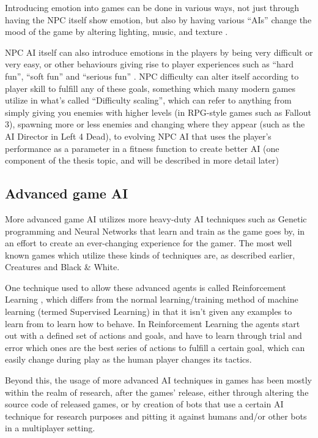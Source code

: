 \documentclass[]{report}
\begin{document}
Introducing emotion into games can be done in various ways, not just through
having the NPC itself show emotion, but also by having various ``AIs'' change
the mood of the game by altering lighting, music, and texture
\citep[chap.~9]{kirby2011introduction}.

NPC AI itself can also introduce emotions in the players by being very difficult
or very easy, or other behaviours giving rise to player experiences such as
``hard fun'', ``soft fun'' and ``serious fun'' \citep{lazzaro2004we}. NPC
difficulty can alter itself according to player skill to fulfill any of these
goals, something which many modern games utilize in what's called ``Difficulty
scaling'', which can refer to anything from simply giving you enemies with
higher levels (in RPG-style games such as Fallout 3), spawning more or less
enemies and changing where they appear (such as the AI Director in Left 4 Dead),
to evolving NPC AI that uses the player's performance as a parameter in a
fitness function to create better AI (one component of the thesis topic, and
will be described in more detail later)

\subsection{Advanced game AI}
\label{sec:advanced-game-ai}

More advanced game AI utilizes more heavy-duty AI techniques such as Genetic
programming and Neural Networks that learn and train as the game goes by, in an
effort to create an ever-changing experience for the gamer. The most well known
games which utilize these kinds of techniques are, as described earlier,
Creatures \citep{grand1997creatures} and Black \& White.

One technique used to allow these advanced agents is called Reinforcement
Learning \citep{merrick2006motivated,sutton1998reinforcement}, which differs
from the normal learning/training method of machine learning (termed Supervised
Learning) in that it isn't given any examples to learn from to learn how to
behave. In Reinforcement Learning the agents start out with a defined set of
actions and goals, and have to learn through trial and error which ones are the
best series of actions to fulfill a certain goal, which can easily change during
play as the human player changes its tactics.

Beyond this, the usage of more advanced AI techniques in games has been mostly
within the realm of research, after the games' release, either through altering
the source code of released games, or by creation of bots that use a certain AI
technique for research purposes and pitting it against humans and/or other bots
in a multiplayer setting.
\end{document}
